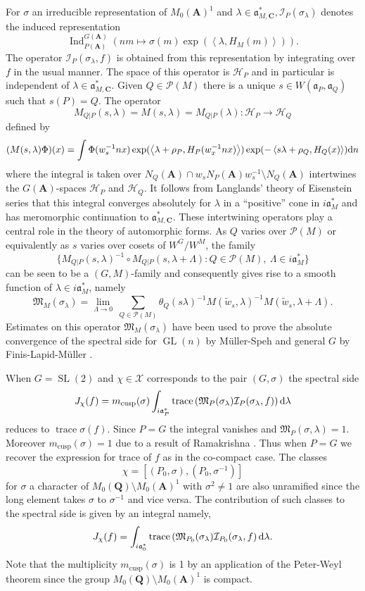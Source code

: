 \documentclass[11pt]{amsart}
\def\A{\mathbf A}
\def\C{\mathbf C}
\def\Q{\mathbf Q}
\def\HHH{\mathcal H}
\def\III{\mathcal I}
\def\MMM{\mathfrak M}	%
\def\PPP{\mathcal P}
\def\XXX{\mathcal X}
\def\aaa{\mathfrak a}
\def\cb#1{{\color{blue}#1}}
\def\d{\text d}
\def\bs{\setminus} 			%
\def\gl{\operatorname{GL}}
\def\Ind{\operatorname{Ind}}
\def\sl{\operatorname{SL}}
\def\sprod#1#2{\left\langle #1 , #2 \right\rangle}  %
\def\trace{\operatorname{trace}}
\theoremstyle{remark}
\begin{document}
For $\sigma$ an irreducible representation of $M_0(\A)^1$ and $\lambda \in \aaa_{M, \C}^*, \III_P(\sigma_\lambda)$ denotes the induced representation
\[ \Ind_{P(\A)}^{G(\A)} \left( nm \mapsto \sigma(m) \exp(\sprod{\lambda}{H_M(m)}) \right). \]
The operator $\III_P(\sigma_\lambda, f)$ is obtained from this representation by integrating over $f$ in the usual manner. The space of this operator is $\HHH_P$ and in particular is independent of $\lambda \in \aaa_{M, \C}^*$. Given $Q \in \PPP(M)$ there is a unique $s \in W(\aaa_P, \aaa_Q)$ such that $s(P) = Q$. The operator
\[ M_{Q|P}(s, \lambda) = M(s, \lambda) = M_{Q|P}(\lambda): \HHH_P \to \HHH_Q \]
defined by
\[ (M(s, \lambda)\Phi)(x) = \int \Phi(w_s^{-1}nx) \exp(\sprod{\lambda + \rho_P}{H_P(w_x^{-1}nx)}) 
		\exp(-\sprod{s\lambda + \rho_Q}{H_Q(x)}) \d n \]
where the integral is taken over $N_Q(\A) \cap w_s N_P(\A) w_s^{-1} \bs N_Q(\A)$ intertwines the $G(\A)$-spaces $\HHH_P$ and $\HHH_Q$. It follows from Langlands' theory of Eisenstein series that this integral converges absolutely for $\lambda$ in a ``positive'' cone in $i\aaa_M^*$ and has meromorphic continuation to $\aaa_{M, \C}^*$. These intertwining operators play a central role in the theory of automorphic forms. As $Q$ varies over $\PPP(M)$ or equivalently as $s$ varies over cosets of $W^G/W^M$, the family
\[ \{ M_{Q|P}(s, \lambda)^{-1} \circ M_{Q|P}(s, \lambda + \Lambda) : Q \in \PPP(M), \ \Lambda \in i\aaa_M^* \} \]
can be seen to be a $(G, M)$-family and consequently gives rise to a smooth function of $\lambda \in i\aaa_M^*$, namely
\[ \MMM_M(\sigma_\lambda) = \lim_{\Lambda \to 0} \ \sum_{Q \in \PPP(M)} \theta_Q(s\lambda)^{-1} M(\tilde w_s, \lambda)^{-1} M(\tilde w_s, \lambda + \Lambda). \]
Estimates on this operator $\MMM_M(\sigma_\lambda)$ have been used to prove the absolute convergence of the spectral side for $\gl(n)$ by M{\"u}ller-Speh \cite{MS} and general $G$ by Finis-Lapid-M{\"u}ller \cite{FLM}.

\cb{When $G = \sl(2)$ and $\chi \in \XXX$ corresponds to the pair $(G, \sigma)$ the spectral side
\[ J_\chi(f) = m_{\text{cusp}}(\sigma) \int_{i\aaa_P^*} \trace\left(\MMM_P(\sigma_\lambda) \III_P(\sigma_\lambda, f)\right) \d \lambda \]
reduces to $\trace \sigma(f)$. Since $P=G$ the integral vanishes and $\MMM_P(\sigma, \lambda) = 1$. Moreover $m_\text{cusp} (\sigma) = 1$ due to a result of Ramakrishna \cite{MR1792292}. Thus when $P=G$ we recover the expression for trace of $f$ as in the co-compact case. The classes 
\[ \chi = [(P_0, \sigma), (P_0, \sigma^{-1})] \]
for $\sigma$ a character of $M_0(\Q) \bs M_0(\A)^1$ with $\sigma^2 \neq 1$ are also unramified since the long element takes $\sigma$ to $\sigma^{-1}$ and vice versa. The contribution of such classes to the spectral side is given by an integral namely,
\[ J_\chi(f) = \int_{i\aaa_0^*} \trace\left(\MMM_{P_0}(\sigma_\lambda) \III_{P_0}(\sigma_\lambda, f\right) \d \lambda. \]
Note that the multiplicity $m_{\text{cusp}}(\sigma)$ is 1 by an application of the Peter-Weyl theorem since the group $M_0(\Q)\bs M_0(\A)^1$ is compact. 
}
\end{document}
